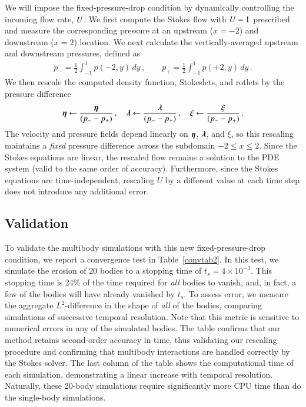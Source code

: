 \documentclass[preprint, 10pt]{elsarticle}
\begin{document}
We will impose the fixed-pressure-drop condition by dynamically controlling the incoming flow rate, $U$. We first compute the Stokes flow with $U = 1$ prescribed and measure the corresponding pressure at an upstream ($x = -2$) and downstream ($x=2$) location. We next calculate the vertically-averaged upstream and downstream pressures, defined as
\begin{align}
p_{-} = \frac{1}{2} \int_{-1}^{1} p(-2,y) \, dy \, , \qquad
p_{+} = \frac{1}{2} \int_{-1}^{1} p(+2,y) \, dy \, .
\end{align}
We then rescale the computed density function, Stokeslets, and rotlets  by the pressure difference
\begin{align}
{\boldsymbol\eta} \leftarrow \frac{{\boldsymbol\eta}}{(p_{-} - p_{+})}\, , \quad 
{\boldsymbol\lambda} \leftarrow \frac{{\boldsymbol\lambda}}{(p_{-} - p_{+})}\, , \quad 
\xi \leftarrow \frac{\xi}{(p_{-} - p_{+})}\, .
\end{align}
The velocity and pressure fields depend linearly on ${\boldsymbol\eta}$, ${\boldsymbol\lambda}$, and $\xi$, so this rescaling maintains a {\em fixed} pressure difference across the subdomain $-2 \le x \le 2$. Since the Stokes equations are linear, the rescaled flow remains a solution to the PDE system (valid to the same order of accuracy). Furthermore, since the Stokes equations are time-independent, rescaling $U$ by a different value at each time step does not introduce any additional error.

\subsection{Validation}

To validate the multibody simulations with this new fixed-pressure-drop condition, we report a convergence test in Table~\ref{convtab2}. In this test, we simulate the erosion of 20 bodies to a stopping time of $t_s = 4 \times 10^{-3}$. This stopping time is 24\% of the time required for {\em all} bodies to vanish, and, in fact, a few of the bodies will have already vanished by $t_s$. To assess error, we measure the aggregate $L^2$-difference in the shape of {\em all} of the bodies, comparing simulations of successive temporal resolution. Note that this metric is sensitive to numerical errors in any of the simulated bodies. The table confirms that our method retains second-order accuracy in time, thus validating our rescaling procedure and confirming that multibody interactions are handled correctly by the Stokes solver. The last column of the table shows the computational time of each simulation, demonstrating a linear increase with temporal resolution. Naturally, these 20-body simulations require significantly more CPU time than do the single-body simulations.
\end{document}
